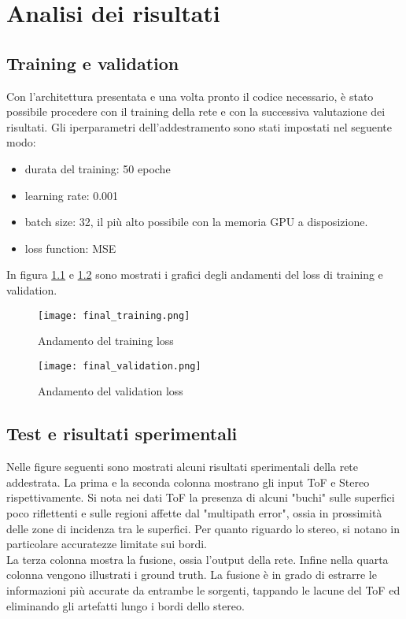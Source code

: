\chapter{Analisi dei risultati}

\section{Training e validation}
Con l'architettura presentata e una volta pronto il codice necessario, è stato possibile procedere con il training della rete e con la successiva valutazione dei risultati.
Gli iperparametri dell'addestramento sono stati impostati nel seguente modo:
\begin{itemize}
    \item durata del training: 50 epoche
    \item learning rate: 0.001
    \item batch size: 32, il più alto possibile con la memoria GPU a disposizione.
    \item loss function: MSE
\end{itemize}
In figura \ref{training} e \ref{validation} sono mostrati i grafici degli andamenti del loss di training e validation.
\begin{figure}[H]
    \centering
    \texttt{[image: final\_training.png]}
    \caption[Andamento del training loss]{Andamento del training loss}
    \label{training}
\end{figure}

\begin{figure}[H]
    \centering
    \texttt{[image: final\_validation.png]}
    \caption[Andamento del validation loss]{Andamento del validation loss}
    \label{validation}
\end{figure}

\section{Test e risultati sperimentali}
Nelle figure seguenti sono mostrati alcuni risultati sperimentali della rete addestrata. La prima e la seconda colonna mostrano gli input ToF e Stereo rispettivamente. Si nota nei dati ToF la presenza di alcuni "buchi" sulle superfici poco riflettenti e sulle regioni affette dal "multipath error", ossia in prossimità delle zone di incidenza tra le superfici. Per quanto riguardo lo stereo, si notano in particolare accuratezze limitate sui bordi.\\
La terza colonna mostra la fusione, ossia l'output della rete. Infine nella quarta colonna vengono illustrati i ground truth. La fusione è in grado di estrarre le informazioni più accurate da entrambe le sorgenti, tappando le lacune del ToF ed eliminando gli artefatti lungo i bordi dello stereo. \\

